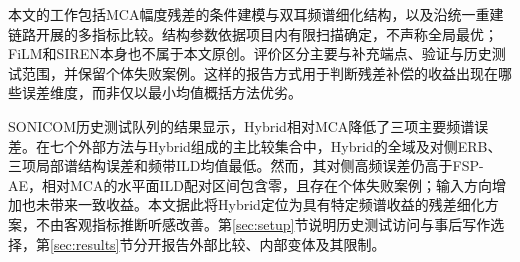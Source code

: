 本文的工作包括MCA幅度残差的条件建模与双耳频谱细化结构，以及沿统一重建链路开展的多指标比较。结构参数依据项目内有限扫描确定，不声称全局最优；FiLM和SIREN本身也不属于本文原创。评价区分主要与补充端点、验证与历史测试范围，并保留个体失败案例。这样的报告方式用于判断残差补偿的收益出现在哪些误差维度，而非仅以最小均值概括方法优劣。

SONICOM历史测试队列的结果显示，Hybrid相对MCA降低了三项主要频谱误差。在七个外部方法与Hybrid组成的主比较集合中，Hybrid的全域及对侧ERB、三项局部谱结构误差和频带ILD均值最低。然而，其对侧高频误差仍高于FSP-AE，相对MCA的水平面ILD配对区间包含零，且存在个体失败案例；输入方向增加也未带来一致收益。本文据此将Hybrid定位为具有特定频谱收益的残差细化方案，不由客观指标推断听感改善。第\ref{sec:setup}节说明历史测试访问与事后写作选择，第\ref{sec:results}节分开报告外部比较、内部变体及其限制。
